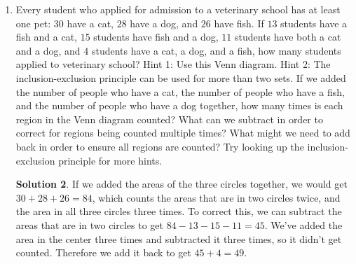 \documentclass{article}
\theoremstyle{definition}
\newtheorem*{solution}{Solution}
\begin{document}
\begin{enumerate}
\begin{solution}
            Another way to do this would be to recognize that a rectangle can be 
            defined by the position of its four sides. There are three ways to 
            choose two of the three horizontal lines to be the top and bottom of 
            the rectangle, and there are six ways to choose two of the four 
            vertical lines to be the sides of the rectangle, so there are $3 
            \cdot 6 = 18$ rectangles.
        \end{solution}
    \item Every student who applied for admission to a veterinary school has at 
        least one pet: $30$ have a cat, $28$ have a dog, and $26$ have fish. If 
        $13$ students have a fish and a cat, $15$ students have fish and a dog, 
        $11$ students have both a cat and a dog, and $4$ students have a cat, a 
        dog, and a fish, how many students applied to veterinary school? Hint 1: 
        Use this Venn diagram. Hint 2: The inclusion-exclusion principle can be 
        used for more than two sets. If we added the number of people who have a 
        cat, the number of people who have a fish, and the number of people who 
        have a dog together, how many times is each region in the Venn diagram 
        counted? What can we subtract in order to correct for regions being 
        counted multiple times? What might we need to add back in order to 
        ensure all regions are counted? Try looking up the inclusion-exclusion 
        principle for more hints.
        \begin{center}
        \end{center}
        \begin{solution}
            If we added the areas of the three circles together, we would get 
            $30 + 28 + 26 = 84$, which counts the areas that are in two circles 
            twice, and the area in all three circles three times. To correct 
            this, we can subtract the areas that are in two circles to get $84 - 
            13 - 15 - 11 = 45$. We've added the area in the center three times 
            and subtracted it three times, so it didn't get counted. Therefore 
            we add it back to get $45 + 4 = 49$.
        \end{solution}
\end{enumerate}
\end{document}
